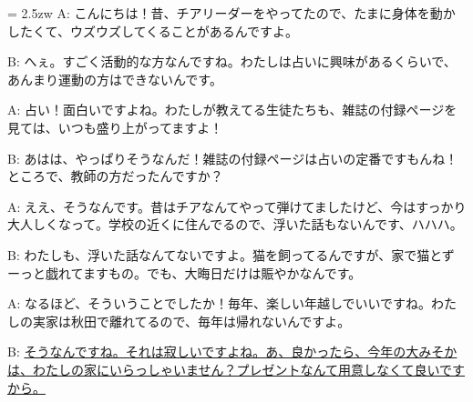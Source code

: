 \documentclass[11pt]{amsart}
\title{}
\author{}
\newenvironment{hangall}[1]{\hangindent = 2.5zw\everypar{\hangindent = 2.5zw}}{}
\begin{document}
\maketitle
\begin{hangall}{}%
A: こんにちは！昔、チアリーダーをやってたので、たまに身体を動かしたくて、ウズウズしてくることがあるんですよ。

B: へぇ。すごく活動的な方なんですね。わたしは占いに興味があるくらいで、あんまり運動の方はできないんです。

A: 占い！面白いですよね。わたしが教えてる生徒たちも、雑誌の付録ページを見ては、いつも盛り上がってますよ！

B: あはは、やっぱりそうなんだ！雑誌の付録ページは占いの定番ですもんね！ところで、教師の方だったんですか？

A: ええ、そうなんです。昔はチアなんてやって弾けてましたけど、今はすっかり大人しくなって。学校の近くに住んでるので、浮いた話もないんです、ハハハ。

B: わたしも、浮いた話なんてないですよ。猫を飼ってるんですが、家で猫とずーっと戯れてますもの。でも、大晦日だけは賑やかなんです。

A: なるほど、そういうことでしたか！毎年、楽しい年越しでいいですね。わたしの実家は秋田で離れてるので、毎年は帰れないんですよ。

B: \ul{そうなんですね。それは寂しいですよね。あ、良かったら、今年の大みそかは、わたしの家にいらっしゃいません？プレゼントなんて用意しなくて良いですから。}\end{hangall}
\end{document}
